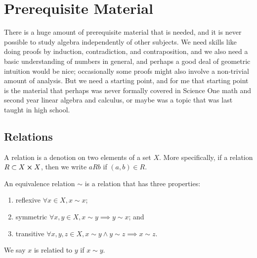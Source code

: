 \section{Prerequisite Material}

\begin{remark}
    There is a huge amount of prerequisite material that is needed,
    and it is never possible to study algebra independently of other subjects.
    We need skills like doing proofs
    by induction, contradiction, and contraposition,
    and we also need a basic understanding of numbers in general,
    and perhaps a good deal of geometric intuition would be nice;
    occasionally some proofs might also involve a non-trivial amount of analysis.
    But we need a starting point,
    and for me that starting point
    is the material that perhaps was never formally covered in Science One math
    and second year linear algebra and calculus,
    or maybe was a topic that was last taught in high school.
\end{remark}

\subsection{Relations}

\begin{definition}
    A relation is a denotion on two elements of a set \(X\).
    More specifically,
    if a relation \(R \subset X \cross X\),
    then we write \(aRb\) if \((a,b) \in R\).
\end{definition}

\begin{definition}
    An equivalence relation \(\sim\)
    is a relation that has three properties:
    \begin{enumerate}[label={(\roman*)}, itemsep=0mm]
        \item reflexive \(\forall x \in X, x \sim x\);
        \item symmetric \(\forall x,y \in X, x \sim y \implies y \sim x\); and
        \item transitive \(\forall x,y,z \in X,
            x \sim y \land y \sim z \implies x \sim z\).
    \end{enumerate}
    We say \(x\) is relatied to \(y\) if \(x \sim y\).
\end{definition}

